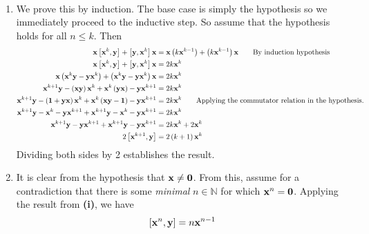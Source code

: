 \begin{solution} $ $\vspace{-1.3em}
    \begin{enumerate}[label=\textbf{\roman*)}]
        \item We prove this by induction. The base case is simply the hypothesis so we immediately proceed to the inductive step. So assume that the hypothesis holds for all \( n \le k \). Then 
        \begin{align*}
            \vb{x} \left[ \vb{x}^{k}, \vb{y} \right] + \left[ \vb{y}, \vb{x}^{k} \right] \vb{x} &= \vb{x} \left( k \vb{x}^{k-1} \right) +  \left( k \vb{x}^{k-1} \right) \vb{x} \tag*{By induction hypothesis} \\
             \vb{x} \left[ \vb{x}^{k}, \vb{y} \right] + \left[ \vb{y}, \vb{x}^{k} \right] \vb{x} &= 2k \vb{x}^{k} \\
             \vb{x} \left( \vb{x}^{k} \vb{y} - \vb{y} \vb{x}^{k} \right) + \left( \vb{x}^{k} \vb{y} - \vb{y} \vb{x}^{k} \right) \vb{x} &= 2k \vb{x}^{k} \\
             \vb{x}^{k+1} \vb{y} - \left( \vb{x} \vb{y} \right) \vb{x}^{k} + \vb{x}^{k} \left( \vb{y} \vb{x} \right) - \vb{y} \vb{x}^{k+1} &= 2k \vb{x}^{k} \\
             \vb{x}^{k+1}\vb{y} - \left( \vb{1} + \vb{y}\vb{x} \right) \vb{x}^{k} + \vb{x}^{k} \left( \vb{x}\vb{y}  - \vb{1}\right) - \vb{y} \vb{x}^{k+1} &= 2k \vb{x}^{k} \tag*{Applying the commutator relation in the hypothesis.} \\ 
             \vb{x}^{k+1}\vb{y} - \vb{x}^{k} - \vb{y} \vb{x}^{k+1} + \vb{x}^{k+1}\vb{y} - \vb{x}^{k} - \vb{y}\vb{x}^{k+1}&= 2k \vb{x}^{k} \\
             \vb{x}^{k+1}\vb{y}  - \vb{y} \vb{x}^{k+1} + \vb{x}^{k+1}\vb{y}  - \vb{y}\vb{x}^{k+1}&= 2k \vb{x}^{k} + 2 \vb{x}^{k}\\ 
             2 \left[ \vb{x}^{k+1}, \vb{y} \right] &= 2 \left( k+1 \right) \vb{x}^{k}
        \end{align*}
        Dividing both sides by 2 establishes the result. 
        \item It is clear from the hypothesis that \( \vb{x} \neq \vb{0} \). From this, assume for a contradiction that there is some \emph{minimal} \( n \in \mathbb{N} \) for which \( \vb{x}^{n} = \vb{0} \). Applying the result from \textbf{(i)}, we have 
        \begin{align*}
            \left[ \vb{x}^{n}, \vb{y} \right] &= n \vb{x}^{n-1} \\

\end{align*}
\end{enumerate}
\end{solution}

